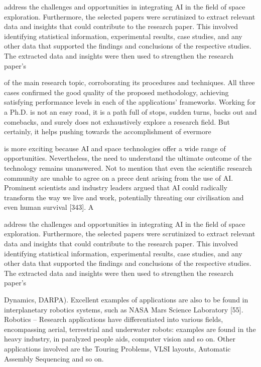 \documentclass[a4paper,12pt]{article}
\begin{document}
address 
the 
challenges 
and 
opportunities in integrating AI in the field of space 
exploration. 
Furthermore, the selected papers were scrutinized to 
extract relevant data and insights that could 
contribute to the research paper. This involved 
identifying statistical information, experimental 
results, case studies, and any other data that 
supported the findings and conclusions of the 
respective studies. The extracted data and insights 
were then used to strengthen the research paper's

of the main research topic, corroborating its procedures and techniques. All
three cases confirmed the good quality of the proposed methodology, achieving
satisfying performance levels in each of the applications’ frameworks.
Working for a Ph.D. is not an easy road, it is a path full of stops, sudden turns,
backs out and comebacks, and surely does not exhaustively explore a research
field. But certainly, it helps pushing towards the accomplishment of evermore

is more exciting because AI and space technologies offer a wide range of 
opportunities. Nevertheless, the need to understand the ultimate 
outcome of the technology remains unanswered. Not to mention that 
even the scientific research community are unable to agree on a prece­
dent arising from the use of AI. Prominent scientists and industry leaders 
argued that AI could radically transform the way we live and work, 
potentially threating our civilisation and even human survival [343]. A

address 
the 
challenges 
and 
opportunities in integrating AI in the field of space 
exploration. 
Furthermore, the selected papers were scrutinized to 
extract relevant data and insights that could 
contribute to the research paper. This involved 
identifying statistical information, experimental 
results, case studies, and any other data that 
supported the findings and conclusions of the 
respective studies. The extracted data and insights 
were then used to strengthen the research paper's

Dynamics, DARPA). Excellent examples of applications are also to be found in 
interplanetary robotics systems, such as NASA Mars Science Laboratory [55]. 
Robotics – Research applications have differentiated into various fields, 
encompassing aerial, terrestrial and underwater robots: examples are found in the 
heavy industry, in paralyzed people aids, computer vision and so on. Other 
applications involved are the Touring Problems, VLSI layouts, Automatic 
Assembly Sequencing and so on.
\end{document}
